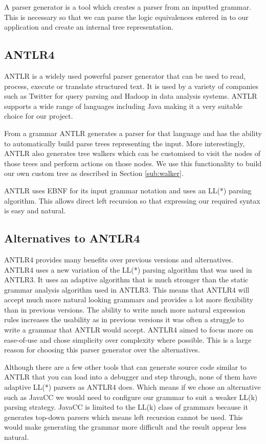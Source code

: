 \documentclass{report}
\begin{document}
A parser generator is a tool which creates a parser from an inputted grammar. This is necessary so that we can parse the logic equivalences entered in to our application and create an internal tree representation.

\subsection{ANTLR4}

ANTLR is a widely used powerful parser generator that can be used to read, process, execute or translate structured text. It is used by a variety of companies such as Twitter for query parsing and Hadoop in data analysis systems. ANTLR supports a wide range of languages including Java making it a very suitable choice for our project.

From a grammar ANTLR generates a parser for that language and has the ability to automatically build parse trees representing the input. More interestingly, ANTLR also generates tree walkers which can be customised to visit the nodes of those trees and perform actions on those nodes. We use this functionality to build our own custom tree as described in Section \ref{sub:walker}.

ANTLR uses EBNF for its input grammar notation and uses an LL(*) parsing algorithm. This allows direct left recursion so that expressing our required syntax is easy and natural. 

\subsection{Alternatives to ANTLR4}
\label{sub:alternatives_to_antlr4}

ANTLR4 provides many benefits over previous versions and alternatives. ANTLR4 uses a new variation of the LL(*) parsing algorithm that was used in ANTLR3. It uses an adaptive algorithm that is much stronger than the static grammar analysis algorithm used in ANTLR3. This means that ANTLR4 will accept much more natural looking grammars and provides a lot more flexibility than in previous versions. The ability to write much more natural expression rules increases the usability as in previous versions it was often a struggle to write a grammar that ANTLR would accept. ANTLR4 aimed to focus more on ease-of-use and chose simplicity over complexity where possible. This is a large reason for choosing this parser generator over the alternatives.

Although there are a few other tools that can generate source code similar to ANTLR that you can load into a debugger and step through, none of them have adaptive LL(*) parsers as ANTLR4 does. Which means if we chose an alternative such as JavaCC we would need to configure our grammar to suit a weaker LL(k) parsing strategy. JavaCC is limited to the LL(k) class of grammars because it generates top-down parsers which means left recursion cannot be used. This would make generating the grammar more difficult and the result appear less natural.
\end{document}
